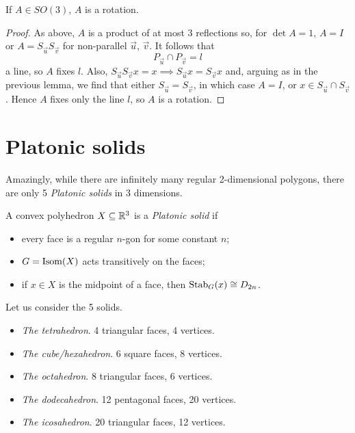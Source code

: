 \documentclass{../../template/note}
\begin{document}
    \begin{lemma}[Elements of \(SO(3)\)]
        If \(A \in SO(3)\), \(A\) is a rotation.
    \end{lemma}
    
    \begin{proof}
        As above, \(A\) is a product of at most \(3\) reflections so, for \(\det A = 1\), \(A = I\) or \(A = S_{\vec u}S_{\vec v}\) for non-parallel \(\vec u\), \(\vec v\). It follows that
        \[
            P_{\vec u} \cap P_{\vec v} = l
        \]
        a line, so \(A\) fixes \(l\). Also, \(S_{\vec u}S_{\vec v}x = x \implies S_{\vec u}x = S_{\vec v}x\) and, arguing as in the previous lemma, we find that either \(S_{\vec u} = S_{\vec v}\), in which case \(A = I\), or \(x \in S_{\vec u} \cap S_{\vec v}\). Hence \(A\) fixes only the line \(l\), so \(A\) is a rotation.
    \end{proof}
    

    \section{Platonic solids}

    Amazingly, while there are infinitely many regular 2-dimensional polygons, there are only 5 \emph{Platonic solids} in 3 dimensions.

    \begin{definition}
        A convex polyhedron \(X \subseteq \mathbb R^3\) is a \emph{Platonic solid} if
        \begin{itemize}
            \item every face is a regular \(n\)-gon for some constant \(n\);
            \item \(G = \operatorname{Isom}(X)\) acts transitively on the faces;
            \item if \(x \in X\) is the midpoint of a face, then \(\operatorname{Stab}_G(x) \cong D_{2n}\).
        \end{itemize}
    \end{definition}
    
    Let us consider the 5 solids.

    \begin{itemize}
        \item \emph{The tetrahedron}. 4 triangular faces, 4 vertices.
        \item \emph{The cube/hexahedron}. 6 square faces, 8 vertices.
        \item \emph{The octahedron}. 8 triangular faces, 6 vertices.
        \item \emph{The dodecahedron}. 12 pentagonal faces, 20 vertices.
        \item \emph{The icosahedron}. 20 triangular faces, 12 vertices.
    \end{itemize}
    
\end{document}
